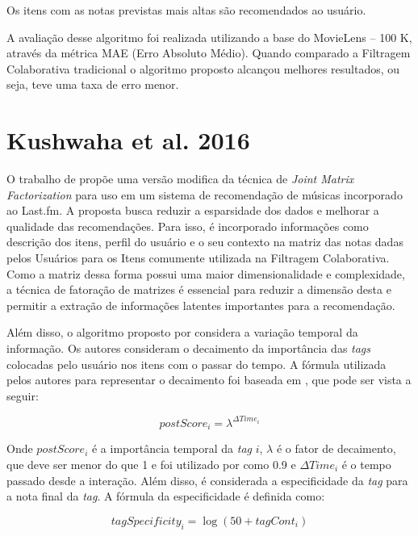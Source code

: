 Os itens com as notas previstas mais altas são recomendados ao usuário.

A avaliação desse algoritmo foi realizada utilizando a base do MovieLens – 100 K, através da métrica MAE (Erro Absoluto
Médio). Quando comparado a Filtragem Colaborativa tradicional o algoritmo proposto alcançou melhores resultados, ou
seja, teve uma taxa de erro menor.

\section{Kushwaha et al. 2016}

O trabalho de  propõe uma versão modifica da técnica de \textit{Joint Matrix Factorization}
para uso em um sistema de recomendação de músicas incorporado ao Last.fm. A proposta busca reduzir a esparsidade dos
dados e melhorar a qualidade das recomendações. Para isso, é incorporado informações como descrição dos itens, perfil
do usuário e o seu contexto na matriz das notas dadas pelos Usuários para os Itens comumente utilizada na Filtragem
Colaborativa. Como a matriz dessa forma possui uma maior dimensionalidade e complexidade, a técnica de fatoração de
matrizes é essencial para reduzir a dimensão desta e permitir a extração de informações latentes importantes para a
recomendação.

Além disso, o algoritmo proposto por  considera a variação temporal da informação.
Os autores consideram o decaimento da importância das \textit{tags} colocadas pelo usuário nos itens com o passar do tempo. A
fórmula utilizada pelos autores para representar o decaimento foi baseada em , que pode ser
vista a seguir:

\begin{equation}
  postScore_i = \lambda^{\Delta Time_i}
  \label{eq:kushwaha-funcao-decaimento}
\end{equation}

Onde $postScore_i$ é a importância temporal da \textit{tag} $i$, $\lambda$ é o fator de decaimento, que deve ser menor do que 1
e foi utilizado por  como 0.9 e $\Delta Time_i$ é o tempo passado desde a interação. Além disso,
é considerada a especificidade da \textit{tag} para a nota final da \textit{tag}. A fórmula da especificidade é definida como:

\begin{equation}
  tagSpecificity_i = \log(50+tagCont_i)
  \label{eq:kushwaha-especificidade}
\end{equation}

